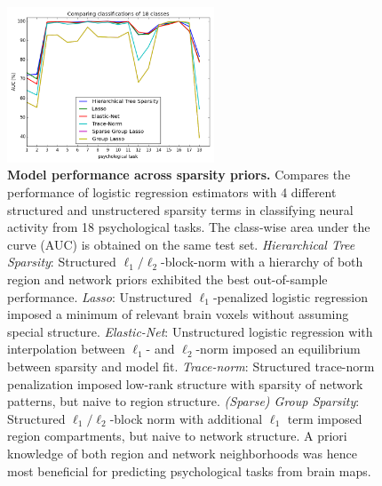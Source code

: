 \documentclass{article}
\begin{document}
\begin{figure}
\begin{centering}
\includegraphics[width=0.55\textwidth]{../figures/ROC_ALL_perclass.png}
\end{centering}
\vspace{-0.4cm}
\caption{\textbf{Model performance across sparsity priors.}
Compares the performance of logistic regression estimators
with 4 different structured and unstructered sparsity terms
in classifying neural activity from 18 psychological tasks.
The class-wise area under the curve (AUC)
is obtained on the same test set.
%
\textit{Hierarchical Tree Sparsity}: Structured
$\ell_1/\ell_2$-block-norm with a hierarchy of
both region and network priors
exhibited the best out-of-sample performance.
\textit{Lasso}: Unstructured $\ell_1$-penalized logistic regression
imposed a minimum of relevant brain voxels without
assuming special structure.
\textit{Elastic-Net}: Unstructured logistic regression
with interpolation between $\ell_1$- and $\ell_2$-norm 
imposed an equilibrium between sparsity and model fit.
\textit{Trace-norm}: Structured trace-norm penalization
imposed low-rank structure
with sparsity of network patterns, but naive to region structure.
\textit{(Sparse) Group Sparsity}: Structured $\ell_1/\ell_2$-block
norm with additional $\ell_1$ term
imposed region compartments, but naive to network structure.
%
A priori knowledge of both region and network neighborhoods
was hence most beneficial for predicting psychological tasks from
brain maps.
}
\label{fig_sparsities}
\end{figure}
\end{document}
